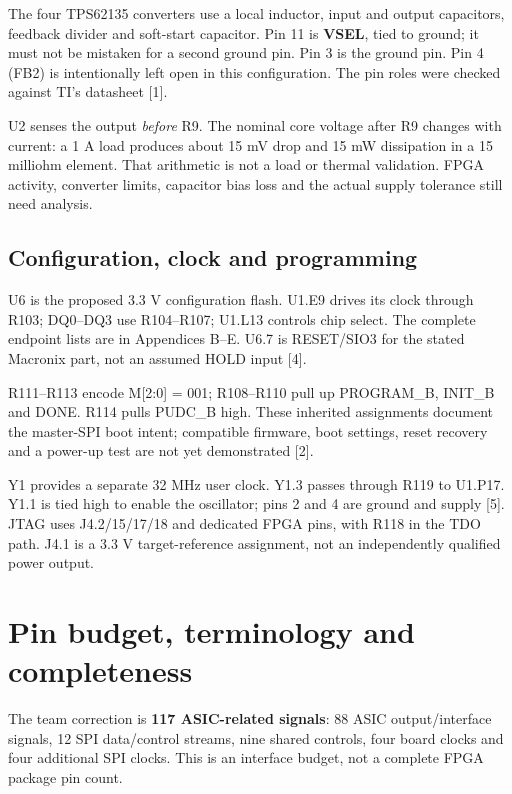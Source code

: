 \documentclass[11pt,a4paper]{article}
\begin{document}
The four TPS62135 converters use a local inductor, input and output capacitors, feedback divider and soft-start capacitor. Pin 11 is \textbf{VSEL}, tied to ground; it must not be mistaken for a second ground pin. Pin 3 is the ground pin. Pin 4 (FB2) is intentionally left open in this configuration. The pin roles were checked against TI's datasheet [1].

U2 senses the output \emph{before} R9. The nominal core voltage after R9 changes with current: a 1 A load produces about 15 mV drop and 15 mW dissipation in a 15 milliohm element. That arithmetic is not a load or thermal validation. FPGA activity, converter limits, capacitor bias loss and the actual supply tolerance still need analysis.

\subsection{Configuration, clock and programming}
U6 is the proposed 3.3 V configuration flash. U1.E9 drives its clock through R103; DQ0--DQ3 use R104--R107; U1.L13 controls chip select. The complete endpoint lists are in Appendices B--E. U6.7 is RESET/SIO3 for the stated Macronix part, not an assumed HOLD input [4].

R111--R113 encode M[2:0] = 001; R108--R110 pull up PROGRAM\_B, INIT\_B and DONE. R114 pulls PUDC\_B high. These inherited assignments document the master-SPI boot intent; compatible firmware, boot settings, reset recovery and a power-up test are not yet demonstrated [2].

Y1 provides a separate 32 MHz user clock. Y1.3 passes through R119 to U1.P17. Y1.1 is tied high to enable the oscillator; pins 2 and 4 are ground and supply [5]. JTAG uses J4.2/15/17/18 and dedicated FPGA pins, with R118 in the TDO path. J4.1 is a 3.3 V target-reference assignment, not an independently qualified power output.
\clearpage
\section{Pin budget, terminology and completeness}
The team correction is \textbf{117 ASIC-related signals}: 88 ASIC output/interface signals, 12 SPI data/control streams, nine shared controls, four board clocks and four additional SPI clocks. This is an interface budget, not a complete FPGA package pin count.
\end{document}

